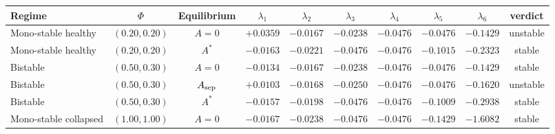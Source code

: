 \begin{tabular}{lccccccccc}
\toprule
Regime & $\Phi$ & Equilibrium & $\lambda_1$ & $\lambda_2$ & $\lambda_3$ & $\lambda_4$ & $\lambda_5$ & $\lambda_6$ & verdict \\
\midrule
Mono-stable healthy & $(0.20,0.20)$ & $A=0$ & $+0.0359$ & $-0.0167$ & $-0.0238$ & $-0.0476$ & $-0.0476$ & $-0.1429$ & unstable \\
Mono-stable healthy & $(0.20,0.20)$ & $A^*$ & $-0.0163$ & $-0.0221$ & $-0.0476$ & $-0.0476$ & $-0.1015$ & $-0.2323$ & stable \\
Bistable & $(0.50,0.30)$ & $A=0$ & $-0.0134$ & $-0.0167$ & $-0.0238$ & $-0.0476$ & $-0.0476$ & $-0.1429$ & stable \\
Bistable & $(0.50,0.30)$ & $A_{\rm sep}$ & $+0.0103$ & $-0.0168$ & $-0.0250$ & $-0.0476$ & $-0.0476$ & $-0.1620$ & unstable \\
Bistable & $(0.50,0.30)$ & $A^*$ & $-0.0157$ & $-0.0198$ & $-0.0476$ & $-0.0476$ & $-0.1009$ & $-0.2938$ & stable \\
Mono-stable collapsed & $(1.00,1.00)$ & $A=0$ & $-0.0167$ & $-0.0238$ & $-0.0476$ & $-0.0476$ & $-0.1429$ & $-1.6082$ & stable \\
\bottomrule
\end{tabular}